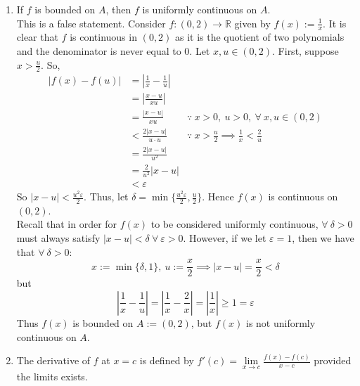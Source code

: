 \documentclass[12pt,letterpaper]{article}
\newcommand{\abs}[1]{\left\lvert #1 \right\rvert}
\newcommand{\R}{\mathbb{R}}
\theoremstyle{case}
\theoremstyle{definition}
\newtheorem*{lemma*}{Lemma}
\begin{document}
\begin{enumerate}
\begin{enumerate}
\begin{proof}
				Recall \textit{Lemma 3.5.2}:
				\begin{lemma*}
					If $X=(x_n)$ is a convergent sequence of real numbers, then $X$ is a Cauchy sequence.
				\end{lemma*}
				Thus by \textit{Lemma 3.5.2}, $(x_{n_k})$ is a Cauchy sequence.\\
				
				Since $f$ is uniformly continuous on $(a,b)$, we know that $f(x_{n_k})$ is also Cauchy. However, this is a contradiction since $f(x_{n_k})$ is clearly divergent. Thus, we have that $f$ is bounded on $(a,b)$.\\
			\end{proof}
			\item If $f$ is bounded on $A$, then $f$ is uniformly continuous on $A$.\\
			
			This is a false statement. Consider $f:(0,2) \to \R$ given by $f(x):=\frac{1}{x}$. It is clear that $f$ is continuous in $(0,2)$ as it is the quotient of two polynomials and the denominator is never equal to 0. Let $x,u \in (0,2)$. First, suppose $x > \frac{u}{2}$. So,
			\begin{align*}
			|f(x)-f(u)| &= \abs{\frac{1}{x}-\frac{1}{u}} \\
			&= \abs{\frac{x-u}{xu}} \\
			&= \frac{|x-u|}{xu} &\because\ x > 0,\ u>0,\ \forall\ x,u \in (0,2) \\
			&< \frac{2|x-u|}{u \cdot u} &\because\ x > \frac{u}{2} \implies \frac{1}{x} < \frac{2}{u} \\
			&= \frac{2|x-u|}{u^2} \\
			&= \frac{2}{u^2}|x-u| \\
			&< \varepsilon
			\end{align*}
			So $|x-u| < \frac{u^2\varepsilon}{2}$. Thus, let $\delta=\min\{\frac{u^2\varepsilon}{2},\frac{u}{2}\}$. Hence $f(x)$ is continuous on $(0,2)$.\\
			
			Recall that in order for $f(x)$ to be considered uniformly continuous, $\forall\ \delta>0$ must always satisfy $|x-u|<\delta\ \forall\ \varepsilon > 0$. However, if we let $\varepsilon=1$, then we have that $\forall\ \delta>0$:
			\[x:=\min\{\delta, 1\},\ u:=\frac{x}{2} \implies |x-u|=\frac{x}{2}<\delta\]
			but
			\[\abs{\frac{1}{x}-\frac{1}{u}} = \abs{\frac{1}{x}-\frac{2}{x}}=\abs{\frac{1}{x}} \geq 1 = \varepsilon\]
			Thus $f(x)$ is bounded on $A:=(0,2)$, but $f(x)$ is not uniformly continuous on $A$.\\
			\item The derivative of $f$ at $x=c$ is defined by $f'(c)=\lim\limits_{x \to c}\frac{f(x)-f(c)}{x-c}$ provided the limits exists.\\
			

\end{enumerate}
\end{enumerate}
\end{document}
